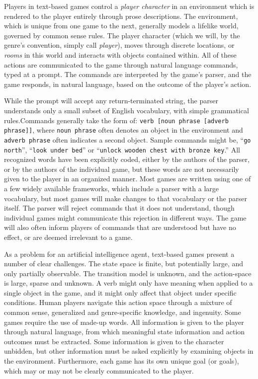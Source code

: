Players in text-based games control a \emph{player character} in an
environment which is rendered to the player entirely through prose
descriptions. The environment, which is unique from one game to the
next, generally models a lifelike world, governed by common sense rules.
The player character (which we will, by the genre's convention, simply
call \emph{player}), moves through discrete locations, or \emph{rooms}
in this world and interacts with objects contained within. All of these
actions are communicated to the game through natural language commands,
typed at a prompt. The commands are interpreted by the game's parser,
and the game responds, in natural language, based on the outcome of the
player's action.

While the prompt will accept any return-terminated string, the parser
understands only a small subset of English vocabulary, with simple
grammatical rules.\footnotemark Commands generally take the form of:
\texttt{verb [noun phrase [adverb phrase]]}, where \texttt{noun phrase}
often denotes an object in the environment and \texttt{adverb phrase}
often indicates a second object. Sample commands might be, ``\texttt{go
north}'', ``\texttt{look under bed}'' or ``\texttt{unlock wooden chest
with bronze key}.''\cite{cote_textworld_2019} All recognized words have
been explicitly coded, either by the authors of the parser, or by the
authors of the individual game, but these words are not necessarily
given to the player in an organized manner. Most games are written using
one of a few widely available frameworks, which include a parser with a
large vocabulary, but most games will make changes to that vocabulary or
the parser itself. The parser will reject commands that it does not
understand, though individual games might communicate this rejection in
different ways. The game will also often inform players of commands that
are understood but have no effect, or are deemed irrelevant to a game.


As a problem for an artificial intelligence agent, text-based games
present a number of clear challenges. The state space is finite, but
potentially large, and only partially observable. The transition model
is unknown, and the action-space is large, sparse and unknown. A verb
might only have meaning when applied to a single object in the game, and
it might only affect that object under specific conditions. Human
players navigate this action space through a mixture of common sense,
generalized and genre-specific knowledge, and ingenuity. Some games
require the use of made-up words. All information is given to the player
through natural language, from which meaningful state information and
action outcomes must be extracted. Some information is given to the
character unbidden, but other information must be asked explicitly by
examining objects in the environment. Furthermore, each game has its own
unique goal (or goals), which may or may not be clearly communicated to
the player.

